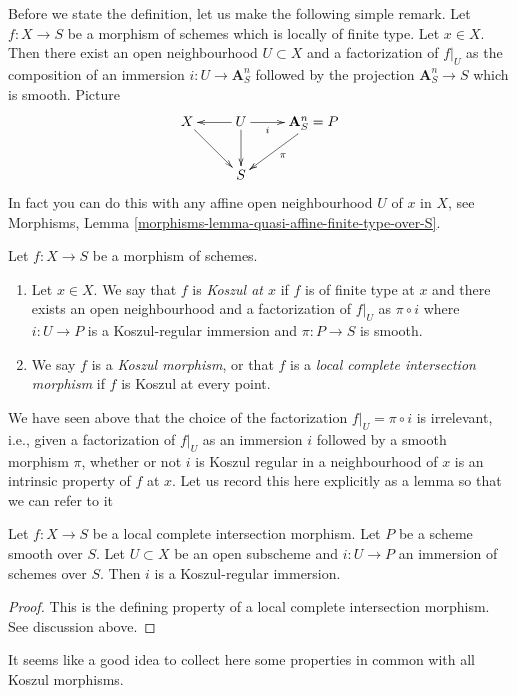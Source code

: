 \noindent
Before we state the definition, let us make the following simple
remark. Let $f : X \to S$ be a morphism of schemes which is locally
of finite type. Let $x \in X$. Then there exist an open neighbourhood
$U \subset X$ and a factorization of $f|_U$ as the composition of an
immersion $i : U \to \mathbf{A}^n_S$ followed by the projection
$\mathbf{A}^n_S \to S$ which is smooth. Picture
$$
\xymatrix{
X \ar[rd] & U \ar[l] \ar[d] \ar[r]_-i & \mathbf{A}^n_S = P \ar[ld]^\pi \\
& S
}
$$
In fact you can do this with any affine open neighbourhood
$U$ of $x$ in $X$, see
Morphisms, Lemma \ref{morphisms-lemma-quasi-affine-finite-type-over-S}.

\begin{definition}
\label{definition-lci}
Let $f : X \to S$ be a morphism of schemes.
\begin{enumerate}
\item Let $x \in X$. We say that $f$ is {\it Koszul at $x$} if $f$
is of finite type at $x$ and there exists an open neighbourhood
and a factorization of $f|_U$ as $\pi \circ i$ where $i : U \to P$
is a Koszul-regular immersion and $\pi : P \to S$ is smooth.
\item We say $f$ is a {\it Koszul morphism}, or that
$f$ is a {\it local complete intersection morphism}
if $f$ is Koszul at every point.
\end{enumerate}
\end{definition}

\noindent
We have seen above that the choice of the factorization
$f|_U = \pi \circ i$ is irrelevant, i.e., given a factorization
of $f|_U$ as an immersion $i$ followed by a smooth morphism $\pi$, whether or
not $i$ is Koszul regular in a neighbourhood of $x$ is an intrinsic
property of $f$ at $x$. Let us record this here explicitly as a lemma
so that we can refer to it

\begin{lemma}
\label{lemma-lci}
Let $f : X \to S$ be a local complete intersection morphism.
Let $P$ be a scheme smooth over $S$. Let $U \subset X$ be an open subscheme
and $i : U \to P$ an immersion of schemes over $S$.
Then $i$ is a Koszul-regular immersion.
\end{lemma}

\begin{proof}
This is the defining property of a local complete intersection
morphism. See discussion above.
\end{proof}

\noindent
It seems like a good idea to collect here some properties in common
with all Koszul morphisms.

